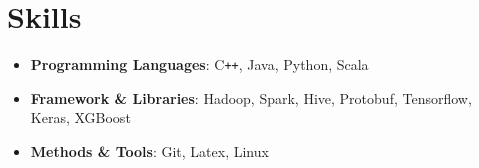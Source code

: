\documentclass[a4paper,11pt]{article}
\begin{document}
\section{Skills}
  \begin{itemize}[leftmargin=*, itemsep=-3pt]
    \item{
      \textbf{Programming Languages}{: C\texttt{++}, Java, Python, Scala}
    }
    \item{
      \textbf{Framework \& Libraries}{: Hadoop, Spark, Hive, Protobuf, Tensorflow, Keras, XGBoost}
    }
    \item{
      \textbf{Methods \& Tools}{: Git, Latex, Linux}
    }
  \end{itemize}


\end{document}
